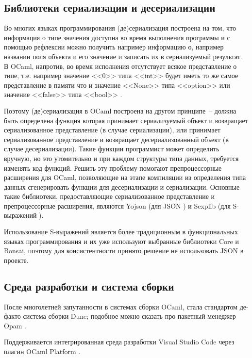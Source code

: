 \subsection{Библиотеки сериализации и десериализации}

Во многих языках программирования (де)сериализация построена на том, что
информация о типе значения доступна во время выполнения программы и с помощью рефлексии можно
получить например информацию о, например названии поля объекта и его значение и записать их в
сериализуемый результат. В OCaml, напротив, во время исполнения отсутствует всякое представление
о типе, т.е. например значение <<0>> типа <<int>> будет иметь то же самое представление в памяти что и
значение <<None>> типа <<option>> или значение <<false>> типа <<bool>> \cite{rwo-runtime-memory}.

Поэтому (де)сериализация в OCaml построена на другом принципе~-- должна быть определена функция которая
принимает сериализуемый объект и возвращает сериализованное представление (в случае сериализации),
или принимает сериализованное представление и возвращает десериализованный объект (в случае десериализации).
Такие функции программист может определить вручную, но это утомительно и при каждом структуры типа данных,
требуется изменять код функций. Решить эту проблему помогают препроцессорные расширения для OCaml, позволяющие
на этапе компиляции из определения типа данных сгенерировать функции для десериализации и сериализации.
Основные такие библиотеки, предоставляющие сериализованное представление и препроцессорные расширения,
являются Yojson (для JSON \cite{rwo-json}) и Sexplib (для S-выражений \cite{rwo-sexp}).

Использование S-выражений является более традиционным в функциональных языках программирования и их
уже используют выбранные библиотеки Core и Bonsai, поэтому для консистентности принято решение
не использовать JSON в проекте.

\subsection{Среда разработки и система сборки}

После многолетней запутанности в системах сборки OCaml, стала стандартом де-факто система сборки Dune;
подобное можно сказать про пакетный менеджер Opam \cite{anil-gemma-qcon}.

Поддерживается интегрированная среда разработки Visual Studio Code через плагин OCaml Platform \cite{rwo-platform}.


